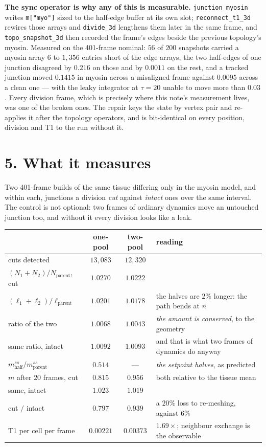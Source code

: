 \documentclass[10pt,a4paper]{article}
\newcommand{\code}[1]{\texttt{#1}}
\begin{document}
\textbf{The sync operator is why any of this is measurable.} \code{junction\_myosin} writes
\code{m["myo"]} sized to the half-edge buffer at its own slot; \code{reconnect\_t1\_3d} rewires those
arrays and \code{divide\_3d} lengthens them later in the same frame, and \code{topo\_snapshot\_3d}
then recorded the frame's edges beside the previous topology's myosin. Measured on the 401-frame
nominal: $56$ of $200$ snapshots carried a myosin array $6$ to $1{,}356$ entries short of the edge
arrays, the two half-edges of one junction disagreed by $0.216$ on those and by $0.0011$ on the rest,
and a tracked junction moved $0.1415$ in myosin across a misaligned frame against $0.0095$ across a
clean one --- with the leaky integrator at $\tau=20$ unable to move more than $0.03$. Every division
frame, which is precisely where this note's measurement lives, was one of the broken ones. The repair
keys the state by vertex pair and re-applies it after the topology operators, and is bit-identical on
every position, division and T1 to the run without it.

\section*{5.\; What it measures}

Two 401-frame builds of the same tissue differing only in the myosin model, and within each, junctions
a division \emph{cut} against \emph{intact} ones over the same interval. The control is not optional:
two frames of ordinary dynamics move an untouched junction too, and without it every division looks
like a leak.

\begin{center}\small
\begin{tabular}{@{}lccl@{}}\toprule
& one-pool & two-pool & reading\\\midrule
cuts detected & $13{,}083$ & $12{,}320$ & \\
$(N_1{+}N_2)/N_{\text{parent}}$, cut & $1.0270$ & $1.0222$ & \\
$(\ell_1{+}\ell_2)/\ell_{\text{parent}}$ & $1.0201$ & $1.0178$ & the halves are $2\%$ longer: the path
bends at $n$\\
\quad ratio of the two & $1.0068$ & $1.0043$ & \emph{the amount is conserved}, to the geometry\\
same ratio, intact & $1.0092$ & $1.0093$ & and that is what two frames of dynamics do anyway\\\midrule
$m^{ss}_{\text{half}}/m^{ss}_{\text{parent}}$ & $0.514$ & --- & \emph{the setpoint halves}, as predicted\\
$m$ after $20$ frames, cut & $0.815$ & $0.956$ & both relative to the tissue mean\\
\quad same, intact & $1.023$ & $1.019$ & \\
\quad cut $/$ intact & $\mathbf{0.797}$ & $\mathbf{0.939}$ & a $20\%$ loss to re-meshing, against
$6\%$\\\midrule
T1 per cell per frame & $0.00221$ & $0.00373$ & $1.69\times$; neighbour exchange is the observable\\
\bottomrule
\end{tabular}
\end{center}
\end{document}
